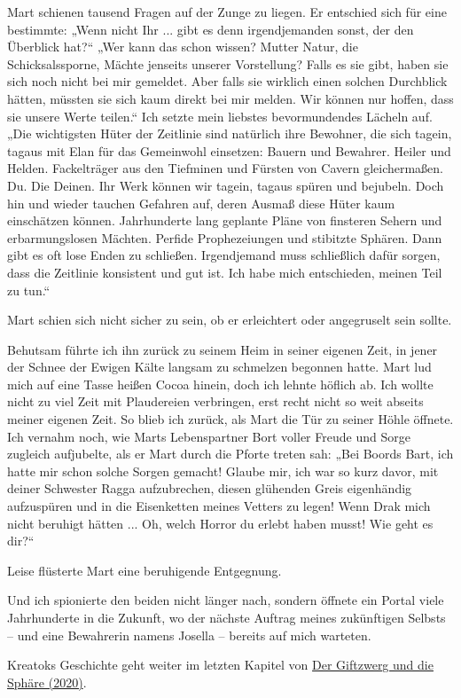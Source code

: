 Mart schienen tausend Fragen auf der Zunge zu liegen. Er entschied sich für eine bestimmte: „Wenn nicht Ihr ... gibt es denn irgendjemanden sonst, der den Überblick hat?“ „Wer kann das schon wissen? Mutter Natur, die Schicksalssporne, Mächte jenseits unserer Vorstellung? Falls es sie gibt, haben sie sich noch nicht bei mir gemeldet. Aber falls sie wirklich einen solchen Durchblick hätten, müssten sie sich kaum direkt bei mir melden. Wir können nur hoffen, dass sie unsere Werte teilen.“ Ich setzte mein liebstes bevormundendes Lächeln auf. „Die wichtigsten Hüter der Zeitlinie sind natürlich ihre Bewohner, die sich tagein, tagaus mit Elan für das Gemeinwohl einsetzen: Bauern und Bewahrer. Heiler und Helden. Fackelträger aus den Tiefminen und Fürsten von Cavern gleichermaßen. Du. Die Deinen. Ihr Werk können wir tagein, tagaus spüren und bejubeln. Doch hin und wieder tauchen Gefahren auf, deren Ausmaß diese Hüter kaum einschätzen können. Jahrhunderte lang geplante Pläne von finsteren Sehern und erbarmungslosen Mächten. Perfide Prophezeiungen und stibitzte Sphären. Dann gibt es oft lose Enden zu schließen. Irgendjemand muss schließlich dafür sorgen, dass die Zeitlinie konsistent und gut ist. Ich habe mich entschieden, meinen Teil zu tun.“ 

Mart schien sich nicht sicher zu sein, ob er erleichtert oder angegruselt sein sollte.

Behutsam führte ich ihn zurück zu seinem Heim in seiner eigenen Zeit, in jener der Schnee der Ewigen Kälte langsam zu schmelzen begonnen hatte. Mart lud mich auf eine Tasse heißen Cocoa hinein, doch ich lehnte höflich ab. Ich wollte nicht zu viel Zeit mit Plaudereien verbringen, erst recht nicht so weit abseits meiner eigenen Zeit. So blieb ich zurück, als Mart die Tür zu seiner Höhle öffnete. Ich vernahm noch, wie Marts Lebenspartner Bort voller Freude und Sorge zugleich aufjubelte, als er Mart durch die Pforte treten sah: „Bei Boords Bart, ich hatte mir schon solche Sorgen gemacht! Glaube mir, ich war so kurz davor, mit deiner Schwester Ragga aufzubrechen, diesen glühenden Greis eigenhändig aufzuspüren und in die Eisenketten meines Vetters zu legen! Wenn Drak mich nicht beruhigt hätten ... Oh, welch Horror du erlebt haben musst! Wie geht es dir?“ 

Leise flüsterte Mart eine beruhigende Entgegnung.

Und ich spionierte den beiden nicht länger nach, sondern öffnete ein Portal viele Jahrhunderte in die Zukunft, wo der nächste Auftrag meines zukünftigen Selbsts – und eine Bewahrerin namens Josella – bereits auf mich warteten. 


\begin{commentbox}
    Kreatoks Geschichte geht weiter im letzten Kapitel von \hyperref[2020-der-giftzwerg-und-die-sphaere]{Der Giftzwerg und die Sphäre (2020)}.
\end{commentbox}

